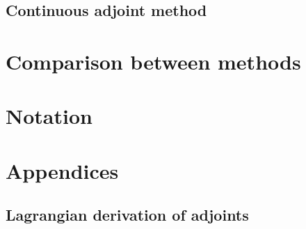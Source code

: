 \documentclass[12pt]{article}
\begin{document}
\subsection{Continuous adjoint method}


\section{Comparison between methods}





\section{Notation}


\newpage
\appendix
\section*{Appendices}
\renewcommand{\thesubsection}{\Alph{subsection}}

\subsection{Lagrangian derivation of adjoints}



\newpage
\printbibliography[heading=bibintoc, title={References}]
\end{document}
